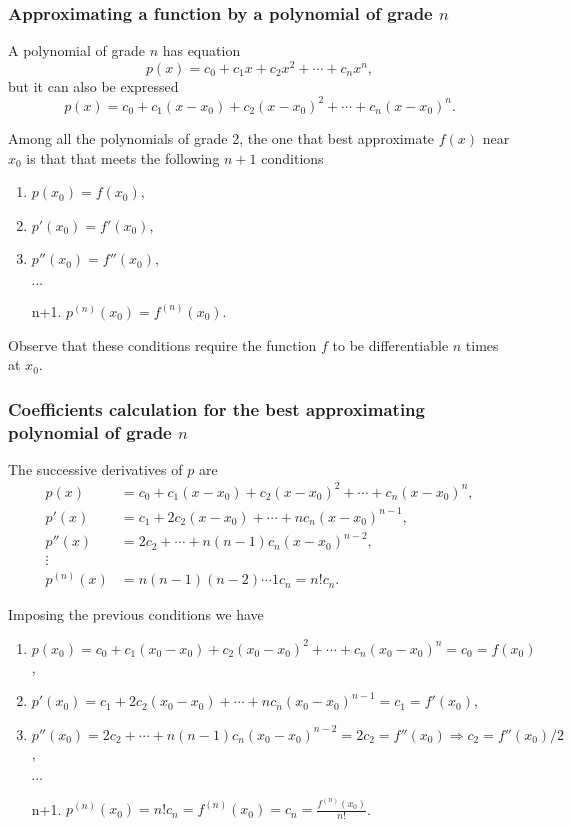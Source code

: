 \begin{frame}
\frametitle{Approximating a function by a polynomial of grade $n$}
A polynomial of grade $n$ has equation
\[
p(x) = c_0+c_1x+c_2x^2+\cdots +c_nx^n,
\]
but it can also be expressed
\[
p(x) = c_0+c_1(x-x_0)+c_2(x-x_0)^2+\cdots +c_n(x-x_0)^n.
\]

Among all the polynomials of grade 2, the one that best approximate $f(x)$ near $x_0$ is that that meets the following $n+1$ conditions
\begin{enumerate}
\item $p(x_0) = f(x_0)$,
\item $p'(x_0) = f'(x_0)$,
\item $p''(x_0)=f''(x_0)$,
\item[] $\cdots$
\item[n+1.] $p^{(n)}(x_0)=f^{(n)}(x_0)$.
\end{enumerate}

\alert{Observe that these conditions require the function $f$ to be differentiable $n$ times at $x_0$.}
\end{frame}


\begin{frame}
\frametitle{Coefficients calculation for the best approximating polynomial of grade $n$}
The successive derivatives of $p$ are 
\begin{align*}
p(x) &= c_0+c_1(x-x_0)+c_2(x-x_0)^2+\cdots +c_n(x-x_0)^n,\\
p'(x)& = c_1+2c_2(x-x_0)+\cdots +nc_n(x-x_0)^{n-1},\\
p''(x)& = 2c_2+\cdots +n(n-1)c_n(x-x_0)^{n-2},\\
\vdots\ \
\\
p^{(n)}(x)&= n(n-1)(n-2)\cdots 1 c_n=n!c_n.
\end{align*}

Imposing the previous conditions we have
\begin{enumerate}
\item $p(x_0) = c_0+c_1(x_0-x_0)+c_2(x_0-x_0)^2+\cdots +c_n(x_0-x_0)^n=c_0=f(x_0)$,
\item $p'(x_0) = c_1+2c_2(x_0-x_0)+\cdots +nc_n(x_0-x_0)^{n-1}=c_1=f'(x_0)$,
\item $p''(x_0) = 2c_2+\cdots +n(n-1)c_n(x_0-x_0)^{n-2}=2c_2=f''(x_0)\Rightarrow c_2=f''(x_0)/2$,
\item[] $\cdots$
\item[n+1.] $p^{(n)}(x_0)=n!c_n=f^{(n)}(x_0)=c_n=\frac{f^{(n)}(x_0)}{n!}$.
\end{enumerate}
\end{frame}


